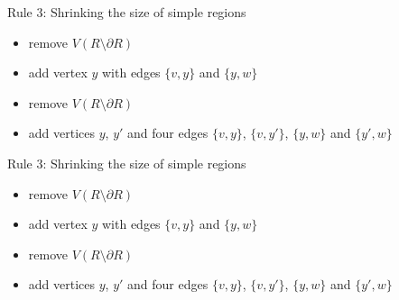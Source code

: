 \begin{frame}[c]{Rule 3: Shrinking the size of simple regions}

    \begin{caseof}
        {\bfseries

            \begin{itemize}
                    \item remove $V(R\setminus\partial R)$
                    \item add vertex $y$ with edges $\{v, y\}$ and $\{y, w\}$
            \end{itemize}
        }


            \begin{itemize}
                    \item remove $V(R\setminus\partial R)$
                    \item add vertices $y$, $y'$ and four edges $\{v,y\}$, $\{v, y'\}$, $\{y, w\}$ and $\{y', w\}$
            \end{itemize}
        \end{caseof}

    \begin{figure}[!ht]
    \end{figure}
\end{frame}

\begin{frame}[c]{Rule 3: Shrinking the size of simple regions}

    \begin{caseof}

            \begin{itemize}
                    \item remove $V(R\setminus\partial R)$
                    \item add vertex $y$ with edges $\{v, y\}$ and $\{y, w\}$
            \end{itemize}
        {\bfseries

            \begin{itemize}
                    \item remove $V(R\setminus\partial R)$
                    \item add vertices $y$, $y'$ and four edges $\{v,y\}$, $\{v, y'\}$, $\{y, w\}$ and $\{y', w\}$
            \end{itemize}
        }
        \end{caseof}

    \begin{figure}[!ht]
    \end{figure}
\end{frame}


